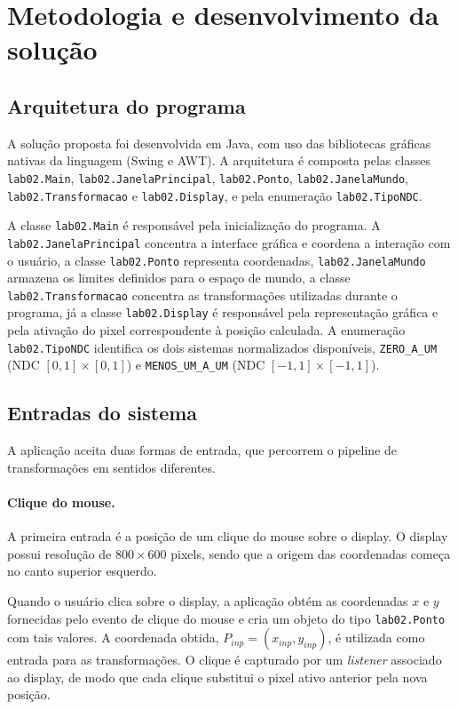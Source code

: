\section{Metodologia e desenvolvimento da solução}
\label{sec:metodologia}

\subsection{Arquitetura do programa}
A solução proposta foi desenvolvida em Java, com uso das bibliotecas gráficas nativas da linguagem (Swing e AWT). A arquitetura é composta pelas classes \texttt{lab02.Main}, \texttt{lab02.JanelaPrincipal}, \texttt{lab02.Ponto}, \texttt{lab02.JanelaMundo}, \texttt{lab02.Transformacao} e \texttt{lab02.Display}, e pela enumeração \texttt{lab02.TipoNDC}.

A classe \texttt{lab02.Main} é responsável pela inicialização do programa. A \texttt{lab02.JanelaPrincipal} concentra a interface gráfica e coordena a interação com o usuário, a classe \texttt{lab02.Ponto} representa coordenadas, \texttt{lab02.JanelaMundo} armazena os limites definidos para o espaço de mundo, a classe \texttt{lab02.Transformacao} concentra as transformações utilizadas durante o programa, já a classe \texttt{lab02.Display} é responsável pela representação gráfica e pela ativação do pixel correspondente à posição calculada. A enumeração \texttt{lab02.TipoNDC} identifica os dois sistemas normalizados disponíveis, \texttt{ZERO\_A\_UM} (NDC \mbox{$[0,1] \times [0,1]$}) e \texttt{MENOS\_UM\_A\_UM} (NDC \mbox{$[-1,1] \times [-1,1]$}).

\subsection{Entradas do sistema}
A aplicação aceita duas formas de entrada, que percorrem o pipeline de transformações em sentidos diferentes.

\paragraph{Clique do mouse.} A primeira entrada é a posição de um clique do mouse sobre o display. O display possui resolução de $800 \times 600$ pixels, sendo que a origem das coordenadas começa no canto superior esquerdo.

Quando o usuário clica sobre o display, a aplicação obtém as coordenadas $x$ e $y$ fornecidas pelo evento de clique do mouse e cria um objeto do tipo \texttt{lab02.Ponto} com tais valores. A coordenada obtida, $P_{inp} = (x_{inp}, y_{inp})$, é utilizada como entrada para as transformações. O clique é capturado por um \textit{listener} associado ao display, de modo que cada clique substitui o pixel ativo anterior pela nova posição.

